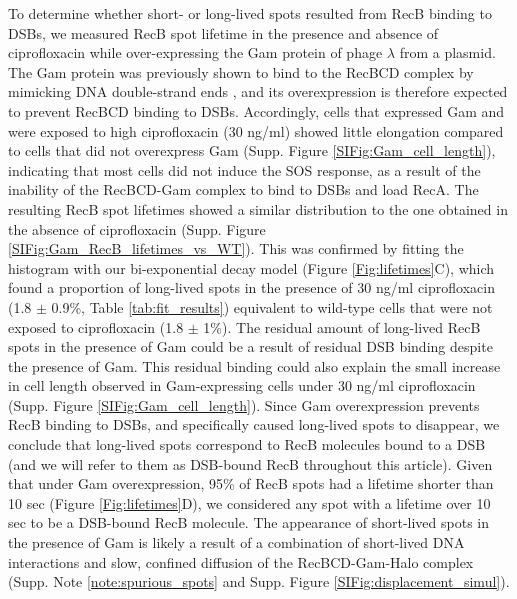 To determine whether short- or long-lived spots resulted from RecB binding to DSBs, we measured RecB spot lifetime in the presence and absence of ciprofloxacin while over-expressing the Gam protein of phage $\lambda$ from a plasmid. The Gam protein was previously shown to bind to the RecBCD complex by mimicking DNA double-strand ends \cite{Wilkinson2016}, and its overexpression is therefore expected to prevent RecBCD binding to DSBs. Accordingly, cells that expressed Gam and were exposed to high ciprofloxacin (30 ng/ml) showed little elongation compared to cells that did not overexpress Gam (Supp. Figure \ref{SIFig:Gam_cell_length}), indicating that most cells did not induce the SOS response, as a result of the inability of the RecBCD-Gam complex to bind to DSBs and load RecA. The resulting RecB spot lifetimes showed a similar distribution to the one obtained in the absence of ciprofloxacin (Supp. Figure \ref{SIFig:Gam_RecB_lifetimes_vs_WT}). This was confirmed by fitting the histogram with our bi-exponential decay model (Figure \ref{Fig:lifetimes}C), which found a proportion of long-lived spots in the presence of 30 ng/ml ciprofloxacin (1.8 $\pm$ 0.9\%, Table \ref{tab:fit_results}) equivalent to wild-type cells that were not exposed to ciprofloxacin (1.8 $\pm$ 1\%). The residual amount of long-lived RecB spots in the presence of Gam could be a result of residual DSB binding despite the presence of Gam. This residual binding could also explain the small increase in cell length observed in Gam-expressing cells under 30 ng/ml ciprofloxacin (Supp. Figure \ref{SIFig:Gam_cell_length}). Since Gam overexpression prevents RecB binding to DSBs, and specifically caused long-lived spots to disappear, we conclude that long-lived spots correspond to RecB molecules bound to a DSB (and we will refer to them as DSB-bound RecB throughout this article). Given that under Gam overexpression, 95\% of RecB spots had a lifetime shorter than 10 sec (Figure \ref{Fig:lifetimes}D), we considered any spot with a lifetime over 10 sec to be a DSB-bound RecB molecule. The appearance of short-lived spots in the presence of Gam is likely a result of a combination of short-lived DNA interactions and slow, confined diffusion of the RecBCD-Gam-Halo complex (Supp. Note \ref{note:spurious_spots} and Supp. Figure \ref{SIFig:displacement_simul}).

